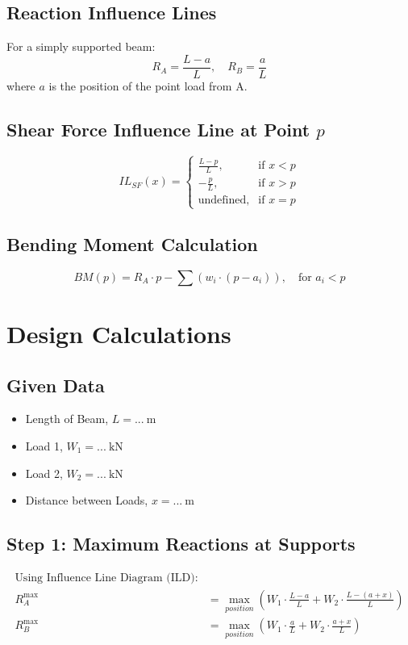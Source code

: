 \documentclass[12pt,a4paper]{article}
\begin{document}
\subsection*{Reaction Influence Lines}
For a simply supported beam:
\[
R_A = \frac{L - a}{L}, \quad R_B = \frac{a}{L}
\]
where \( a \) is the position of the point load from A.

\subsection*{Shear Force Influence Line at Point \( p \)}
\[
IL_{SF}(x) = 
\begin{cases}
\frac{L - p}{L}, & \text{if } x < p \\
-\frac{p}{L}, & \text{if } x > p \\
\text{undefined}, & \text{if } x = p
\end{cases}
\]

\subsection*{Bending Moment Calculation}
\[
BM(p) = R_A \cdot p - \sum (w_i \cdot (p - a_i)), \quad \text{for } a_i < p
\]

\section{Design Calculations}

\subsection*{Given Data}
\begin{itemize}
    \item Length of Beam, $L = \textbf{...}~\text{m}$
    \item Load 1, $W_1 = \textbf{...}~\text{kN}$
    \item Load 2, $W_2 = \textbf{...}~\text{kN}$
    \item Distance between Loads, $x = \textbf{...}~\text{m}$
\end{itemize}

\subsection*{Step 1: Maximum Reactions at Supports}
\begin{align*}
\text{Using Influence Line Diagram (ILD):} \\
R_A^{\max} &= \max_{position} \left( W_1 \cdot \frac{L - a}{L} + W_2 \cdot \frac{L - (a + x)}{L} \right) \\
R_B^{\max} &= \max_{position} \left( W_1 \cdot \frac{a}{L} + W_2 \cdot \frac{a + x}{L} \right)
\end{align*}
\end{document}
